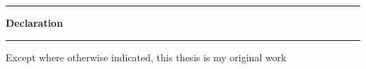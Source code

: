 \thispagestyle{plain}
\begin{center}
    \vspace{0.8cm}
    \rule{18cm}{0.5pt}
    \raggedright
    
    \huge

    \textbf{Declaration}\\
    \rule{18cm}{0.5pt}
    
    \vspace{3cm}
    
    \normalsize
    
    Except where otherwise indicated, this thesis is my original work


\end{center}
